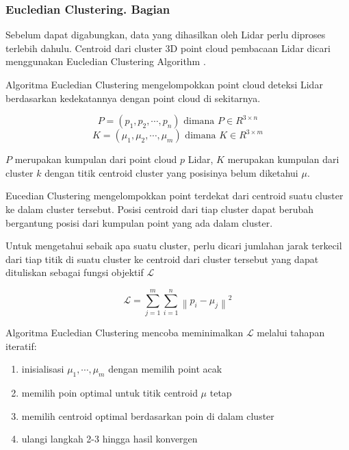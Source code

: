 \begin{frame}[allowframebreaks]
    \frametitle{Eucledian Clustering. Bagian}

    Sebelum dapat digabungkan, data yang dihasilkan oleh Lidar perlu diproses terlebih dahulu. Centroid dari cluster 3D point cloud pembacaan Lidar dicari menggunakan Eucledian Clustering Algorithm \cite{schutze2008introduction}.

    Algoritma Eucledian Clustering mengelompokkan point cloud deteksi Lidar berdasarkan kedekatannya dengan point cloud di sekitarnya.

    \begin{equation}
        P = (p_1, p_2, \cdots, p_n) \text{ dimana } P \in R^{3 \times n}
    \end{equation}
    \begin{equation}
        K = (\mu_1, \mu_2, \cdots, \mu_m) \text{ dimana } K \in R^{3 \times m}
    \end{equation}

    $P$ merupakan kumpulan dari point cloud $p$ Lidar, $K$ merupakan kumpulan dari cluster $k$ dengan titik centroid cluster yang posisinya belum diketahui $\mu$.

    \pagebreak

    Eucedian Clustering mengelompokkan point terdekat dari centroid suatu cluster ke dalam cluster tersebut. Posisi centroid dari tiap cluster dapat berubah bergantung posisi dari kumpulan point yang ada dalam cluster.

    Untuk mengetahui sebaik apa suatu cluster, perlu dicari jumlahan jarak terkecil dari tiap titik di suatu cluster ke centroid dari cluster tersebut \cite{schutze2008introduction} yang dapat dituliskan sebagai fungsi objektif $\mathcal{L}$

    \begin{equation}
        \mathcal{L} = \sum_{j=1}^{m}\sum_{i=1}^{n}\left\|p_{i}-\mu_{j}\right\|^{2}
        \label{eq: objective-cluster}
    \end{equation}

    \pagebreak

    Algoritma Eucledian Clustering mencoba meminimalkan $\mathcal{L}$ melalui tahapan iteratif:
        \begin{enumerate}
            \item inisialisasi $\mu_1, \cdots, \mu_m$ dengan memilih point acak
            \item memilih poin optimal untuk titik centroid $\mu$ tetap
            \item memilih centroid optimal berdasarkan poin di dalam cluster
            \item ulangi langkah 2-3 hingga hasil konvergen
        \end{enumerate}
\end{frame}


